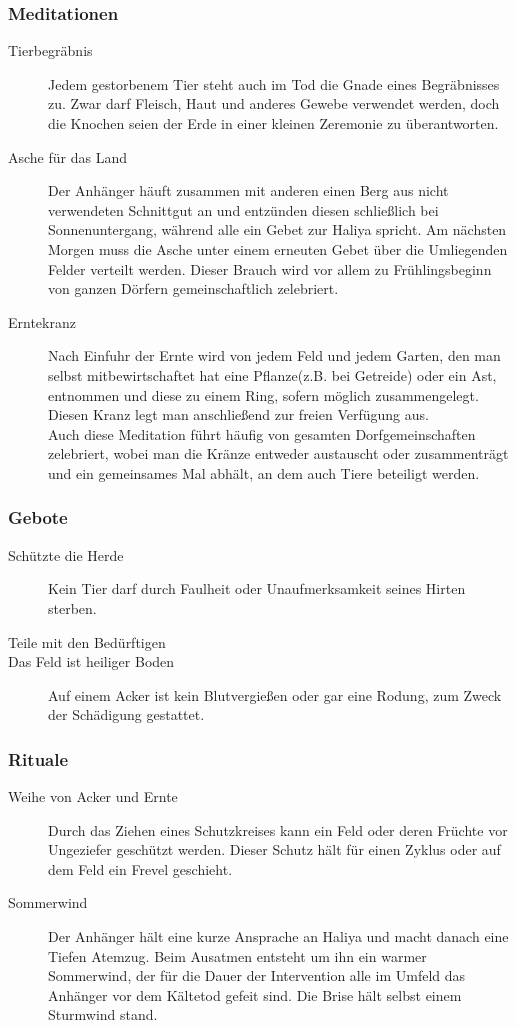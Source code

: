 \documentclass[a4paper,12pt,oneside]{book}
\begin{document}
\subsubsection{Meditationen}
\begin{description}
\item[Tierbegräbnis]
Jedem gestorbenem Tier steht auch im Tod die Gnade eines Begräbnisses zu. Zwar darf Fleisch, Haut und anderes Gewebe verwendet werden, doch die Knochen seien der Erde in einer kleinen Zeremonie zu überantworten.
\item[Asche für das Land]
Der Anhänger häuft zusammen mit anderen einen Berg aus nicht verwendeten Schnittgut an und entzünden diesen schließlich bei Sonnenuntergang, während alle ein Gebet zur Haliya spricht. Am nächsten Morgen muss die Asche unter einem erneuten Gebet über die Umliegenden Felder verteilt werden. Dieser Brauch wird vor allem zu Frühlingsbeginn von ganzen Dörfern gemeinschaftlich zelebriert.
\item[Erntekranz] 
Nach Einfuhr der Ernte wird von jedem Feld und jedem Garten, den man selbst mitbewirtschaftet hat eine Pflanze(z.B. bei Getreide) oder ein Ast, entnommen und diese zu einem Ring, sofern möglich zusammengelegt. Diesen Kranz legt man anschließend zur freien Verfügung aus.
\\Auch diese Meditation führt häufig von gesamten Dorfgemeinschaften zelebriert, wobei man die Kränze entweder austauscht oder zusammenträgt und ein gemeinsames Mal abhält, an dem auch Tiere beteiligt werden.
\end{description}
\subsubsection{Gebote}
\begin{description}
\item[Schützte die Herde]
Kein Tier darf durch Faulheit oder Unaufmerksamkeit seines Hirten sterben.
\item[Teile mit den Bedürftigen]
\item[Das Feld ist heiliger Boden]
Auf einem Acker ist kein Blutvergießen oder gar eine Rodung, zum Zweck der Schädigung gestattet.
\end{description}
\subsubsection{Rituale}
\begin{description}
\item[Weihe von Acker und Ernte]
Durch das Ziehen eines Schutzkreises kann ein Feld oder deren Früchte vor Ungeziefer geschützt werden. Dieser Schutz hält für einen Zyklus oder auf dem Feld ein Frevel geschieht.
\item[Sommerwind]
Der Anhänger hält eine kurze Ansprache an Haliya und macht danach eine Tiefen Atemzug. Beim Ausatmen entsteht um ihn ein warmer Sommerwind, der für die Dauer der Intervention alle im Umfeld das Anhänger vor dem Kältetod gefeit sind. Die Brise hält selbst einem Sturmwind stand.
\end{description}
\end{document}

